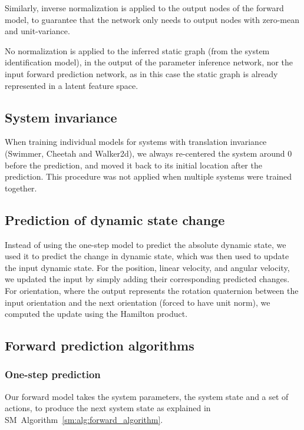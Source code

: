 Similarly, inverse normalization is applied to the output nodes of the forward model, to guarantee that the network only needs to output nodes with zero-mean and unit-variance. 

No normalization is applied to the inferred static graph (from the system identification model), in the output of the parameter inference network, nor the input forward prediction network, as in this case the static graph is already represented in a latent feature space.

\subsection{System invariance}
\label{sm:sec:training_invariance}

When training individual models for systems with translation invariance (Swimmer, Cheetah and Walker2d), we always re-centered the system around 0 before the prediction, and moved it back to its initial location after the prediction. This procedure was not applied when multiple systems were trained together.

\subsection{Prediction of dynamic state change}
\label{sm:sec:delta_prediction}
Instead of using the one-step model to predict the absolute dynamic state, we used it to predict the change in dynamic state, which was then used to update the input dynamic state. For the position, linear velocity, and angular velocity, we updated the input by simply adding their corresponding predicted changes. For orientation, where the output represents the rotation quaternion between the input orientation and the next orientation (forced to have unit norm), we computed the update using the Hamilton product.

\subsection{Forward prediction algorithms}

\subsubsection{One-step prediction}
\label{sm:alg:one_step_prediction}

Our forward model takes the system parameters, the system state and a set of actions, to produce the next system state as explained in SM~Algorithm~\ref{sm:alg:forward_algorithm}.

